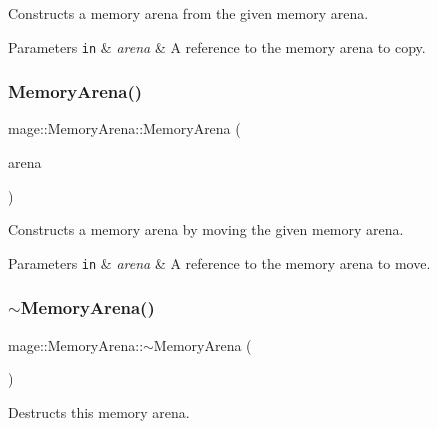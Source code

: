 Constructs a memory arena from the given memory arena.


\begin{DoxyParams}[1]{Parameters}
\mbox{\tt in}  & {\em arena} & A reference to the memory arena to copy. \\
\hline
\end{DoxyParams}
\hypertarget{classmage_1_1_memory_arena_a98829c5a87ba028c376f100cca09e876}{}\label{classmage_1_1_memory_arena_a98829c5a87ba028c376f100cca09e876} 
\subsubsection{\texorpdfstring{Memory\+Arena()}{MemoryArena()}\hspace{0.1cm}{\footnotesize\ttfamily [3/3]}}
{\footnotesize\ttfamily mage\+::\+Memory\+Arena\+::\+Memory\+Arena (\begin{DoxyParamCaption}\item[{\hyperlink{classmage_1_1_memory_arena}{Memory\+Arena} \&\&}]{arena }\end{DoxyParamCaption})\hspace{0.3cm}{\ttfamily [default]}}

Constructs a memory arena by moving the given memory arena.


\begin{DoxyParams}[1]{Parameters}
\mbox{\tt in}  & {\em arena} & A reference to the memory arena to move. \\
\hline
\end{DoxyParams}
\hypertarget{classmage_1_1_memory_arena_acfee6fc205e2eaf6aeef4acf19948e6e}{}\label{classmage_1_1_memory_arena_acfee6fc205e2eaf6aeef4acf19948e6e} 
\subsubsection{\texorpdfstring{$\sim$\+Memory\+Arena()}{~MemoryArena()}}
{\footnotesize\ttfamily mage\+::\+Memory\+Arena\+::$\sim$\+Memory\+Arena (\begin{DoxyParamCaption}{ }\end{DoxyParamCaption})}

Destructs this memory arena. 

